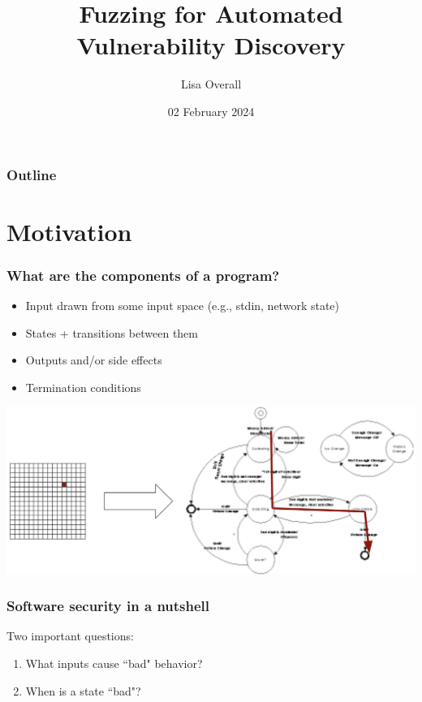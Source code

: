 \documentclass{beamer}
\title[Fuzzing Workshop]{Fuzzing for Automated Vulnerability Discovery}
\author{Lisa Overall}
\date{02 February 2024}
\begin{document}
\frame{\titlepage}

\begin{frame}
\frametitle{Outline}
\tableofcontents
\end{frame}


\section[Motivation]{Motivation}

\begin{frame}
\frametitle{What are the components of a program?}
	
	\begin{itemize}
		\item{Input drawn from some input space (e.g., stdin, network state)}
		\item{States + transitions between them}
		\item{Outputs and/or side effects}
		\item{Termination conditions}
	\end{itemize}

	\centering \includegraphics[scale=.45]{program}

\end{frame}

\begin{frame}
	\frametitle{Software security in a nutshell}
	\LARGE{
	Two important questions:
	\begin{enumerate}
		\item{What inputs cause ``bad" behavior?}
		\item{When is a state ``bad"?}
	\end{enumerate}
	}
\end{frame}
\end{document}
